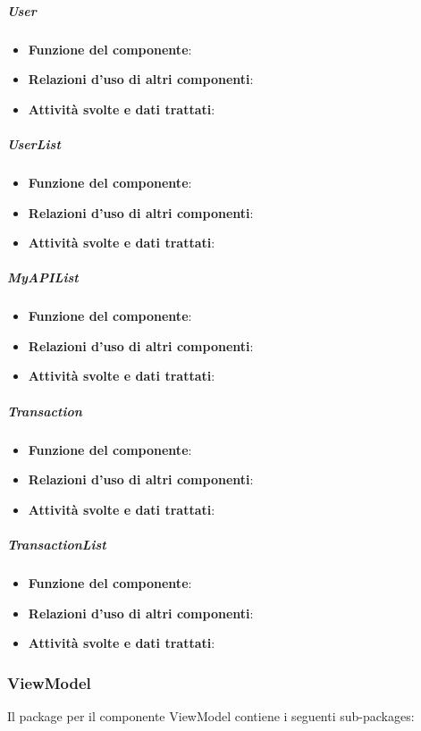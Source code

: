 \subparagraph{User}
\begin{itemize}
	\item \textbf{Funzione del componente}: 
	\item \textbf{Relazioni d’uso di altri componenti}: 
	\item \textbf{Attività svolte e dati trattati}: 
\end{itemize}

\subparagraph{UserList}
\begin{itemize}
	\item \textbf{Funzione del componente}: 
	\item \textbf{Relazioni d’uso di altri componenti}: 
	\item \textbf{Attività svolte e dati trattati}: 
\end{itemize}

\subparagraph{MyAPIList}
\begin{itemize}
	\item \textbf{Funzione del componente}: 
	\item \textbf{Relazioni d’uso di altri componenti}: 
	\item \textbf{Attività svolte e dati trattati}: 
\end{itemize}

\subparagraph{Transaction}
\begin{itemize}
	\item \textbf{Funzione del componente}: 
	\item \textbf{Relazioni d’uso di altri componenti}: 
	\item \textbf{Attività svolte e dati trattati}: 
\end{itemize}

\subparagraph{TransactionList}
\begin{itemize}
	\item \textbf{Funzione del componente}: 
	\item \textbf{Relazioni d’uso di altri componenti}: 
	\item \textbf{Attività svolte e dati trattati}: 
\end{itemize}


\subsubsection{ViewModel}

Il package per il componente ViewModel contiene i seguenti sub-packages:

